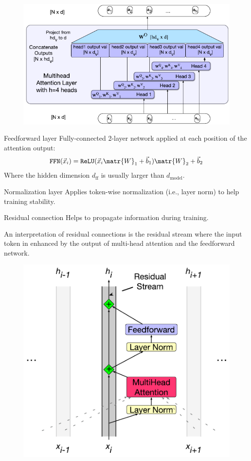 \begin{description}
\begin{descriptionlist}
                \begin{figure}[H]
                    \centering
                    \includegraphics[width=0.6\linewidth]{./img/_multi_head_attention.pdf}
                \end{figure}

            \item[Feedforward layer]
                Fully-connected 2-layer network applied at each position of the attention output:
                \[ \texttt{FFN}(\vec{x}_i) = \texttt{ReLU}(\vec{x}_i\matr{W}_1 + \vec{b}_1)\matr{W}_2 + \vec{b}_2 \]
                Where the hidden dimension $d_\text{ff}$ is usually larger than $d_\text{model}$.

            \item[Normalization layer]
                Applies token-wise normalization (i.e., layer norm) to help training stability.

            \item[Residual connection]
                Helps to propagate information during training.

                \begin{remark}
                    An interpretation of residual connections is the residual stream where the input token in enhanced by the output of multi-head attention and the feedforward network.

                    \begin{figure}[H]
                        \centering
                        \includegraphics[width=0.38\linewidth]{./img/_residual_stream.pdf}
                    \end{figure}
                \end{remark}
        \end{descriptionlist}


\end{description}
